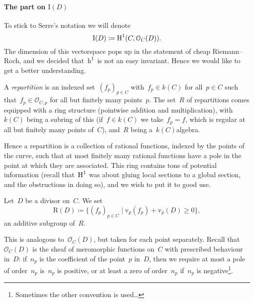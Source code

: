 \documentclass[10pt,a4paper]{article}
\begin{document}
\paragraph{The part on $\mathrm{I}(D)$}
To stick to Serre's notation we will denote
\begin{equation}
  \mathrm{I}(D)\coloneqq\operatorname{H}^1(C,\mathcal{O}_C(D)).
\end{equation}
The dimension of this vectorspace pops up in the statement of cheap Riemann--Roch, and we decided that~$\operatorname{h}^1$ is not an easy invariant. Hence we would like to get a better understanding.
\begin{definition}
  A \emph{repartition} is an indexed set~$(f_p)_{p\in C}$ with~$f_p\in k(C)$ for all~$p\in C$ such that~$f_p\in\mathcal{O}_{C,p}$ for all but finitely many points~$p$. The set~$R$ of repartitions comes equipped with a ring structure (pointwise addition and multiplication), with~$k(C)$ being a subring of this (if~$f\in k(C)$ we take~$f_p=f$, which is regular at all but finitely many points of~$C$), and~$R$ being a~$k(C)$\dash algebra.
\end{definition}
Hence a repartition is a collection of rational functions, indexed by the points of the curve, such that at most finitely many rational functions have a pole in the point at which they are associated. This ring contains tons of potential information (recall that~$\operatorname{H}^1$ was about gluing local sections to a global section, and the obstructions in doing so), and we wish to put it to good use.
\begin{definition}
  Let~$D$ be a divisor on~$C$. We set
  \begin{equation}
    \mathrm{R}(D)\coloneqq\{(f_p)_{p\in C}\mid \mathrm{v}_p(f_p)+\mathrm{v}_p(D)\geq 0\},
  \end{equation}
  an additive subgroup of~$R$.
\end{definition}
This is analogous to~$\mathcal{O}_C(D)$, but taken for each point separately. Recall that~$\mathcal{O}_C(D)$ is the sheaf of meromorphic functions on~$C$ with prescribed behaviour in~$D$: if~$n_p$ is the coefficient of the point~$p$ in~$D$, then we require at most a pole of order~$n_p$ is~$n_p$ is positive, or at least a zero of order~$n_p$ if~$n_p$ is negative\footnote{Sometimes the other convention is used\dots}.
\end{document}
